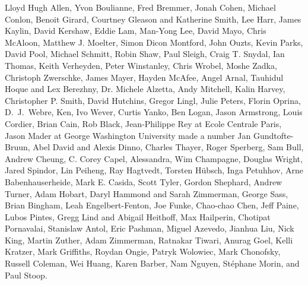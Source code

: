 \documentclass[10pt]{book}
\begin{document}
Lloyd Hugh Allen,
Yvon Boulianne,
Fred Bremmer,
Jonah Cohen,
Michael Conlon,
Benoit Girard,
Courtney Gleason and Katherine Smith,
Lee Harr,
James Kaylin,
David Kershaw,
Eddie Lam,
Man-Yong Lee,
David Mayo,
Chris McAloon,
Matthew J. Moelter,
Simon Dicon Montford,
John Ouzts,
Kevin Parks,
David Pool,
Michael Schmitt,
Robin Shaw,
Paul Sleigh,
Craig T. Snydal,
Ian Thomas,
Keith Verheyden,
Peter Winstanley,
Chris Wrobel,
Moshe Zadka,
Christoph Zwerschke,
James Mayer,
Hayden McAfee,
Angel Arnal,
Tauhidul Hoque and Lex Berezhny,
Dr. Michele Alzetta,
Andy Mitchell,
Kalin Harvey,
Christopher P. Smith,
David Hutchins,
Gregor Lingl,
Julie Peters,
Florin Oprina,
D.~J.~Webre,
Ken,
Ivo Wever,
Curtis Yanko,
Ben Logan,
Jason Armstrong,
Louis Cordier,
Brian Cain,
Rob Black,
Jean-Philippe Rey at Ecole Centrale Paris,
Jason Mader at George Washington University made a number
Jan Gundtofte-Bruun,
Abel David and Alexis Dinno,
Charles Thayer,
Roger Sperberg,
Sam Bull,
Andrew Cheung,
C. Corey Capel,
Alessandra,
Wim Champagne,
Douglas Wright,
Jared Spindor,
Lin Peiheng,
Ray Hagtvedt,
Torsten H\"{u}bsch,
Inga Petuhhov,
Arne Babenhauserheide,
Mark E. Casida,
Scott Tyler,
Gordon Shephard,
Andrew Turner,
Adam Hobart,
Daryl Hammond and Sarah Zimmerman,
George Sass,
Brian Bingham,
Leah Engelbert-Fenton,
Joe Funke,
Chao-chao Chen,
Jeff Paine,
Lubos Pintes,
Gregg Lind and Abigail Heithoff,
Max Hailperin,
Chotipat Pornavalai,
Stanislaw Antol,
Eric Pashman,
Miguel Azevedo,
Jianhua Liu,
Nick King,
Martin Zuther,
Adam Zimmerman,
Ratnakar Tiwari,
Anurag Goel,
Kelli Kratzer,
Mark Griffiths,
Roydan Ongie,
Patryk Wolowiec,
Mark Chonofsky,
Russell Coleman,
Wei Huang,
Karen Barber,
Nam Nguyen,
St\'{e}phane Morin,
and
Paul Stoop.


\normalsize

\printindex

\clearemptydoublepage
\end{document}
